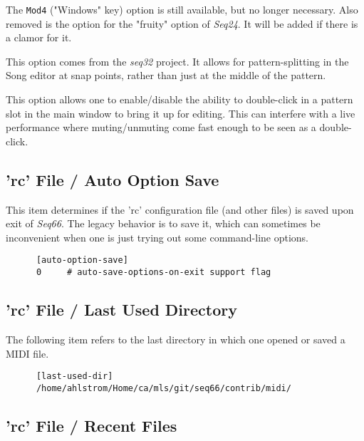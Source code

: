    The \texttt{Mod4} ("Windows" key) option is still available, but no longer
   necessary.  Also removed is the option for the "fruity" option
   of \textsl{Seq24}.
   It will be added if there is a clamor for it.

   This option comes from the \textsl{seq32} project.  It allows for
   pattern-splitting in the Song editor at snap points, rather than just
   at the middle of the pattern.

   This option allows one to enable/disable the ability to double-click
   in a pattern slot in the main window to bring it up for editing.
   This can interfere with a live performance where muting/unmuting come fast
   enough to be seen as a double-click.

\subsection{'rc' File / Auto Option Save}
\label{subsec:configuration_auto_rc_save}

   This item determines if the 'rc' configuration file (and other files)
   is saved
   upon exit of \textsl{Seq66}.  The legacy behavior is to save it,
   which can sometimes be inconvenient when one is just trying out some
   command-line options.

   \begin{verbatim}
      [auto-option-save]
      0     # auto-save-options-on-exit support flag
   \end{verbatim}

\subsection{'rc' File / Last Used Directory}
\label{subsec:configuration_last_used_dir}

   The following item refers to the last directory in which one opened or
   saved a MIDI file.

   \begin{verbatim}
      [last-used-dir]
      /home/ahlstrom/Home/ca/mls/git/seq66/contrib/midi/
   \end{verbatim}

\subsection{'rc' File / Recent Files}
\label{subsec:configuration_recent_files}


